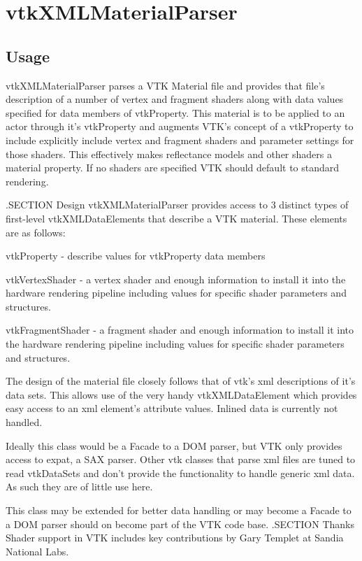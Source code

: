 \section{vtkXMLMaterialParser}

\subsection{Usage}

 vtkXMLMaterialParser parses a VTK Material file and provides that file's
 description of a number of vertex and fragment shaders along with data
 values specified for data members of vtkProperty. This material is to be
 applied to an actor through it's vtkProperty and augments VTK's concept
 of a vtkProperty to include explicitly include vertex and fragment shaders
 and parameter settings for those shaders. This effectively makes reflectance
 models and other shaders  a material property. If no shaders are specified
 VTK should default to standard rendering.

 .SECTION Design
 vtkXMLMaterialParser provides access to 3 distinct types of first-level
 vtkXMLDataElements that describe a VTK material. These elements are as
 follows:

 vtkProperty - describe values for vtkProperty data members

 vtkVertexShader - a vertex shader and enough information to
 install it into the hardware rendering pipeline including values for
 specific shader parameters and structures.

 vtkFragmentShader - a fragment shader and enough information to
 install it into the hardware rendering pipeline including values for
 specific shader parameters and structures.

 The design of the material file closely follows that of vtk's xml
 descriptions of it's data sets. This allows use of the very handy
 vtkXMLDataElement which provides easy access to an xml element's 
 attribute values. Inlined data is currently not handled.

 Ideally this class would be a Facade to a DOM parser, but VTK only
 provides access to expat, a SAX parser. Other vtk classes that parse
 xml files are tuned to read vtkDataSets and don't provide the functionality
 to handle generic xml data. As such they are of little use here.

 This class may be extended for better data  handling or may become a
 Facade to a DOM parser should on become part of the VTK code base.
 .SECTION Thanks
 Shader support in VTK includes key contributions by Gary Templet at 
 Sandia National Labs.

